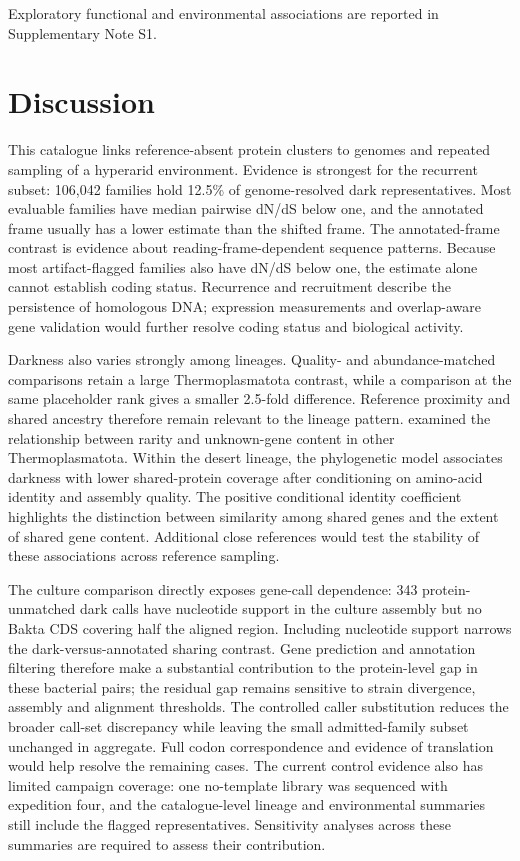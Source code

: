 \documentclass[11pt]{article}
\begin{document}
Exploratory functional and environmental associations are reported in Supplementary Note S1.

\section*{Discussion}

This catalogue links reference-absent protein clusters to genomes and repeated sampling of a
hyperarid environment. Evidence is strongest for the recurrent subset: 106{,}042 families hold
12.5\% of genome-resolved dark representatives.
Most evaluable families have median pairwise dN/dS below one, and the annotated frame usually
has a lower estimate than the shifted frame. The annotated-frame contrast is evidence about reading-frame-dependent sequence patterns. Because most artifact-flagged families also have dN/dS below one, the estimate alone cannot establish coding status. Recurrence and recruitment describe the
persistence of homologous DNA; expression measurements and overlap-aware gene validation would further resolve coding status and biological activity.

Darkness also varies strongly among lineages. Quality- and abundance-matched comparisons
retain a large Thermoplasmatota contrast, while a comparison at the same placeholder rank gives
a smaller 2.5-fold difference. Reference proximity and shared ancestry therefore remain relevant
to the lineage pattern. \citet{maeke2025thermoplasmatota} examined the relationship between rarity
and unknown-gene content in other Thermoplasmatota. Within the desert lineage, the phylogenetic model associates darkness with lower shared-protein coverage after conditioning on amino-acid identity and assembly quality. The positive conditional identity coefficient highlights the distinction between similarity among shared genes and the extent of shared gene content. Additional close references would test the stability of these associations across reference sampling.

The culture comparison directly exposes gene-call dependence: 343 protein-unmatched dark calls have nucleotide support in the culture assembly but no Bakta CDS covering half the aligned region. Including nucleotide support narrows the dark-versus-annotated sharing contrast. Gene prediction and annotation filtering therefore make a substantial contribution to the protein-level gap in these bacterial pairs; the residual gap remains sensitive to strain divergence, assembly and alignment thresholds. The controlled caller substitution reduces the broader call-set discrepancy while leaving the small admitted-family subset unchanged in aggregate. Full codon correspondence and evidence of translation would help resolve the remaining cases. The current control evidence also has limited campaign
coverage: one no-template library was sequenced with expedition four, and the catalogue-level
lineage and environmental summaries still include the flagged representatives. Sensitivity
analyses across these summaries are required to assess their contribution.
\end{document}
